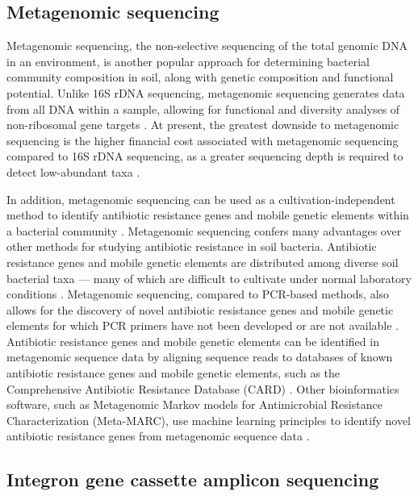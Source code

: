 \subsection{Metagenomic sequencing}

Metagenomic sequencing, the non-selective sequencing of the total genomic DNA in an environment, is another popular approach for determining bacterial community composition in soil, along with genetic composition and functional potential.
Unlike 16S rDNA sequencing, metagenomic sequencing generates data from all DNA within a sample, allowing for functional and diversity analyses of non-ribosomal gene targets \parencite{Li.2015c}.
At present, the greatest downside to metagenomic sequencing is the higher financial cost associated with metagenomic sequencing compared to 16S rDNA sequencing, as a greater sequencing depth is required to detect low-abundant taxa \parencite{Scholz.2012}.

In addition, metagenomic sequencing can be used as a cultivation-independent method to identify antibiotic resistance genes and mobile genetic elements within a bacterial community \parencite{Boolchandani.2019}.
Metagenomic sequencing confers many advantages over other methods for studying antibiotic resistance in soil bacteria.
Antibiotic resistance genes and mobile genetic elements are distributed among diverse soil bacterial taxa --- many of which are difficult to cultivate under normal laboratory conditions \parencite{Dunivin.2019}.
Metagenomic sequencing, compared to PCR-based methods, also allows for the discovery of novel antibiotic resistance genes and mobile genetic elements for which PCR primers have not been developed or are not available \parencite{Boolchandani.2019}.
Antibiotic resistance genes and mobile genetic elements can be identified in metagenomic sequence data by aligning sequence reads to databases of known antibiotic resistance genes and mobile genetic elements, such as the Comprehensive Antibiotic Resistance Database (CARD) \parencite{Alcock.2020}.
Other bioinformatics software, such as Metagenomic Markov models for Antimicrobial Resistance Characterization (Meta-MARC), use machine learning principles to identify novel antibiotic resistance genes from metagenomic sequence data \parencite{Lakin.2019}.

\subsection{Integron gene cassette amplicon sequencing}

